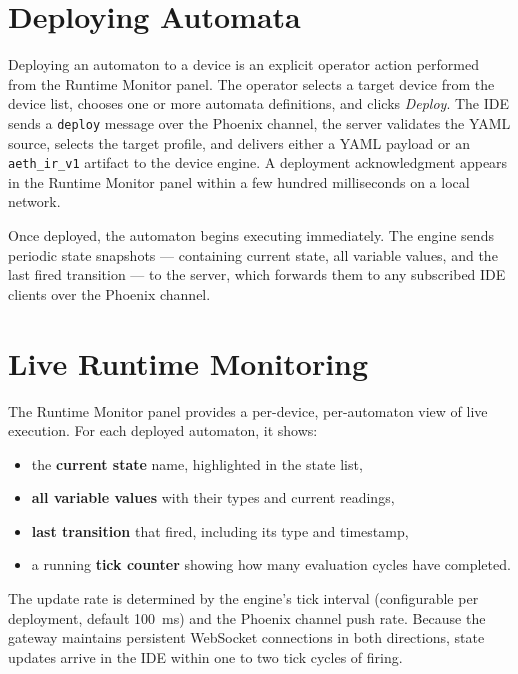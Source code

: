 \section{Deploying Automata}
\label{sec:demo-deploy}

Deploying an automaton to a device is an explicit operator action performed from
the Runtime Monitor panel. The operator selects a target device from the device
list, chooses one or more automata definitions, and clicks \textit{Deploy}.
The IDE sends a \texttt{deploy} message over the Phoenix channel, the server
validates the YAML source, selects the target profile, and delivers either a YAML
payload or an \texttt{aeth\_ir\_v1} artifact to the device engine. A deployment
acknowledgment appears in the Runtime Monitor panel within a few hundred
milliseconds on a local network.

Once deployed, the automaton begins executing immediately. The engine sends
periodic state snapshots — containing current state, all variable values, and
the last fired transition — to the server, which forwards them to any subscribed
IDE clients over the Phoenix channel.

\section{Live Runtime Monitoring}
\label{sec:demo-monitor}

The Runtime Monitor panel provides a per-device, per-automaton view of live
execution. For each deployed automaton, it shows:

\begin{itemize}
  \item the \textbf{current state} name, highlighted in the state list,
  \item \textbf{all variable values} with their types and current readings,
  \item \textbf{last transition} that fired, including its type and timestamp,
  \item a running \textbf{tick counter} showing how many evaluation cycles have
    completed.
\end{itemize}

\noindent The update rate is determined by the engine's tick interval
(configurable per deployment, default 100~ms) and the Phoenix channel push
rate. Because the gateway maintains persistent WebSocket connections in both
directions, state updates arrive in the IDE within one to two tick cycles of
firing.

